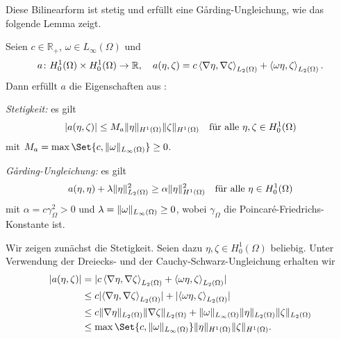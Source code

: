 Diese Bilinearform ist stetig und erfüllt eine G\aa{}rding-Ungleichung, wie das folgende Lemma zeigt.

\begin{Lemma}
\label{lemma:a_bf_bounded_garding}
    Seien $c \in \mathbb{R}_{+}$, $\omega \in L_{\infty}(\Omega)$ und
    \begin{equation}
    \label{eq:bf_a}
        a \colon H^{1}_{0}(\Omega) \times H^{1}_{0}(\Omega) \to \mathbb{R}, \quad a(\eta, \zeta) = c \left\langle\nabla \eta,\nabla \zeta\right\rangle_{L_{2}(\Omega)} + \left\langle\omega \eta,\zeta\right\rangle_{L_{2}(\Omega)}.
    \end{equation}
    Dann erfüllt $a$ die Eigenschaften aus :
    \begin{thmenumerate}
        \item\label{lemma:a_bf_bounded_garding:1}
        \emph{Stetigkeit:} es gilt
        \begin{equation}
            \lvert a(\eta, \zeta)\rvert \leq M_{a} \lVert\eta\rVert_{H^{1}(\Omega)} \lVert\zeta\rVert_{H^{1}(\Omega)} \quad \text{für alle}~\eta, \zeta \in H^{1}_{0}(\Omega)
        \end{equation}
        mit $M_{a} = \max\Set{c, \norm{\omega}_{L_{\infty}(\Omega)} } \geq 0$.
        \item\label{lemma:a_bf_bounded_garding:2}
        \emph{G\aa{}rding-Ungleichung:} es gilt
        \begin{equation}
                a(\eta, \eta) + \lambda \lVert\eta\rVert_{L_{2}(\Omega)}^{2} \geq \alpha \lVert\eta\rVert_{H^{1}(\Omega)}^{2} \quad \text{für alle}~\eta \in H^{1}_{0}(\Omega)
        \end{equation}
        mit $\alpha = c \gamma_{\Omega}^{2} > 0$ und $\lambda = \lVert\omega\rVert_{L_{\infty}(\Omega)} \geq 0$, wobei $\gamma_{\Omega}$ die Poincaré-Friedrichs-Konstante ist.
    \end{thmenumerate}

    \begin{Beweis}
    Wir zeigen zunächst die Stetigkeit.
    Seien dazu $\eta, \zeta \in H^{1}_{0}(\Omega)$ beliebig.
    Unter Verwendung der Dreiecks- und der Cauchy-Schwarz-Ungleichung erhalten wir
    \begin{align}
        \abs{a(\eta, \zeta)}
        &= \abs{c \skprod{\grad \eta}{\grad \zeta}_{L_{2}(\Omega)} + \skprod{\omega \eta}{\zeta}_{L_{2}(\Omega)}}
        \\&\leq c \abs{\skprod{\grad \eta}{\grad \zeta}_{L_{2}(\Omega)}} + \abs{\skprod{\omega \eta}{\zeta}_{L_{2}(\Omega)}}
        \\&\leq c \norm{\grad \eta}_{L_{2}(\Omega)} \norm{\grad \zeta}_{L_{2}(\Omega)} + \norm{\omega}_{L_{\infty}(\Omega)} \norm{\eta}_{L_{2}(\Omega)} \norm{\zeta}_{L_{2}(\Omega)}
        \\&\leq \max \Set{ c, \norm{\omega}_{L_{\infty}(\Omega)} } \norm{\eta}_{H^{1}(\Omega)} \norm{\zeta}_{H^{1}(\Omega)}.
    \end{align}


\end{Beweis}
\end{Lemma}
